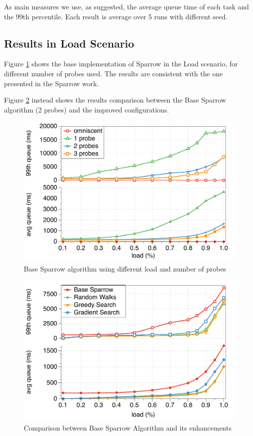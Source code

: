 \documentclass[conference]{IEEEtran}
\begin{document}
As main measures we use, as suggested, the average queue time of each task and the 99th percentile.
Each result is average over 5 runs with different seed.

\subsection{Results in Load Scenario}

Figure \ref{fig:probes} shows the base implementation of Sparrow in the Load scenario, for different number of probes used. The results are consistent with the one presented in the Sparrow work.

Figure \ref{fig:comparison} instead shows the results comparison between the Base Sparrow algorithm (2 probes) and the improved configurations.

\begin{figure}
\begin{center}
\includegraphics[scale=0.5]{figures/probes_new}
\caption{Base Sparrow algorithm using different load and number of probes}
\label{fig:probes}
\end{center}
\end{figure}

\begin{figure}
\begin{center}
\includegraphics[scale=0.5]{figures/comparison_new}
\caption{Comparison between Base Sparrow Algorithm and its enhancements}
\label{fig:comparison}
\end{center}
\end{figure}
\end{document}
